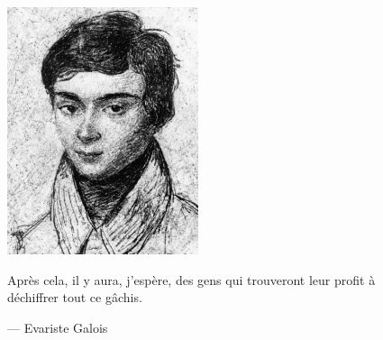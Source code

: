 % 

% 

\begin{figure}[p]
	\centering
	\includegraphics[width=0.5\textwidth]{../figure/Evariste Galois}
	\vspace{2.1cm}
	
	{\large{} Après cela, il y aura, j'espère, des gens qui trouveront leur profit à déchiffrer tout ce gâchis.}
	
	\begin{flushright}
		--- {\large{} Evariste Galois}
	\end{flushright}
\end{figure}
	
% 
